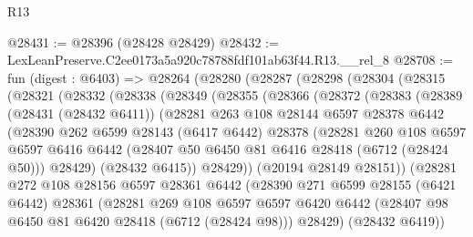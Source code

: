 \begin{lexlean}{R13}
\begin{coremodule}
@28431 := @28396 (@28428 @28429)
@28432 := LexLeanPreserve.C2ee0173a5a920c78788fdf101ab63f44.R13.__rel_8
@28708 := fun (digest : @6403) =>
  @28264
    (@28280
      (@28287
        (@28298
          (@28304
            (@28315
              (@28321
                (@28332
                  (@28338
                    (@28349
                      (@28355
                        (@28366
                          (@28372
                            (@28383
                              (@28389
                                (@28431 (@28432 @6411))
                                (@28281
                                  @263
                                  @108
                                  @28144
                                  @6597
                                  @28378
                                  @6442
                                  (@28390
                                    @262
                                    @6599
                                    @28143
                                    (@6417 @6442)
                                    @28378
                                    (@28281
                                      @260
                                      @108
                                      @6597
                                      @6597
                                      @6416
                                      @6442
                                      (@28407 @50 @6450 @81 @6416 @28418 (@6712 (@28424 @50)))
                                      @28429)
                                    (@28432 @6415))
                                  @28429))
                              (@20194 @28149 @28151))
                            (@28281
                              @272
                              @108
                              @28156
                              @6597
                              @28361
                              @6442
                              (@28390
                                @271
                                @6599
                                @28155
                                (@6421 @6442)
                                @28361
                                (@28281
                                  @269
                                  @108
                                  @6597
                                  @6597
                                  @6420
                                  @6442
                                  (@28407 @98 @6450 @81 @6420 @28418 (@6712 (@28424 @98)))
                                  @28429)
                                (@28432 @6419))

\end{coremodule}
\end{lexlean}
